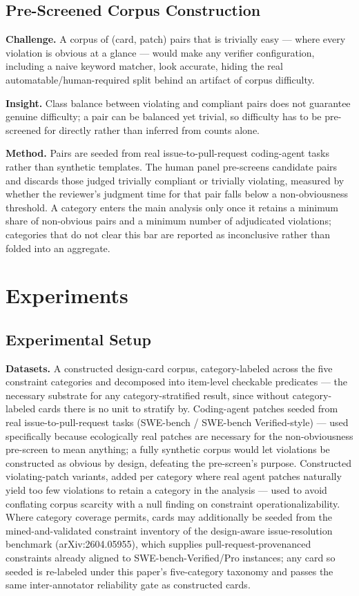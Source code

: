 \documentclass[11pt]{article}
\begin{document}
\subsection{Pre-Screened Corpus Construction}
\textbf{Challenge.} A corpus of (card, patch) pairs that is trivially easy --- where every violation is obvious at a glance --- would make any verifier configuration, including a naive keyword matcher, look accurate, hiding the real automatable/human-required split behind an artifact of corpus difficulty.

\textbf{Insight.} Class balance between violating and compliant pairs does not guarantee genuine difficulty; a pair can be balanced yet trivial, so difficulty has to be pre-screened for directly rather than inferred from counts alone.

\textbf{Method.} Pairs are seeded from real issue-to-pull-request coding-agent tasks rather than synthetic templates. The human panel pre-screens candidate pairs and discards those judged trivially compliant or trivially violating, measured by whether the reviewer's judgment time for that pair falls below a non-obviousness threshold. A category enters the main analysis only once it retains a minimum share of non-obvious pairs and a minimum number of adjudicated violations; categories that do not clear this bar are reported as inconclusive rather than folded into an aggregate.

\section{Experiments}

\subsection{Experimental Setup}

\textbf{Datasets.} A constructed design-card corpus, category-labeled across the five constraint categories and decomposed into item-level checkable predicates --- the necessary substrate for any category-stratified result, since without category-labeled cards there is no unit to stratify by. Coding-agent patches seeded from real issue-to-pull-request tasks (SWE-bench / SWE-bench Verified-style) --- used specifically because ecologically real patches are necessary for the non-obviousness pre-screen to mean anything; a fully synthetic corpus would let violations be constructed as obvious by design, defeating the pre-screen's purpose. Constructed violating-patch variants, added per category where real agent patches naturally yield too few violations to retain a category in the analysis --- used to avoid conflating corpus scarcity with a null finding on constraint operationalizability. Where category coverage permits, cards may additionally be seeded from the mined-and-validated constraint inventory of the design-aware issue-resolution benchmark (arXiv:2604.05955), which supplies pull-request-provenanced constraints already aligned to SWE-bench-Verified/Pro instances; any card so seeded is re-labeled under this paper's five-category taxonomy and passes the same inter-annotator reliability gate as constructed cards.
\end{document}
